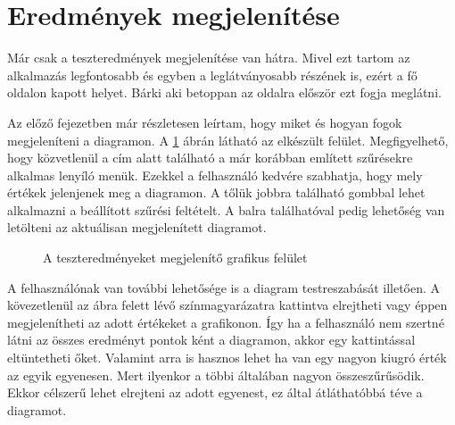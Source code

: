 \documentclass[12pt]{report} %
\begin{document}
\section{Eredmények megjelenítése} %

Már csak a teszteredmények megjelenítése van hátra. Mivel ezt tartom az alkalmazás legfontosabb és egyben a leglátványosabb részének is, ezért a fő oldalon kapott helyet. Bárki aki betoppan az oldalra először ezt fogja meglátni.

Az előző fejezetben már részletesen leírtam, hogy miket és hogyan fogok megjeleníteni a diagramon. A \ref{fig:Implementation9} ábrán látható az elkészült felület. Megfigyelhető, hogy közvetlenül a cím alatt található a már korábban említett szűrésekre alkalmas lenyíló menük. Ezekkel a felhasználó kedvére szabhatja, hogy mely értékek jelenjenek meg a diagramon. A tőlük jobbra található gombbal lehet alkalmazni a beállított szűrési feltételt. A balra találhatóval pedig lehetőség van letölteni az aktuálisan megjelenített diagramot.

\begin{figure}[H]
    \centering %
    \caption{A teszteredményeket megjelenítő grafikus felület} %
    \label{fig:Implementation9} %
\end{figure}

A felhasználónak van további lehetősége is a diagram testreszabását illetően. A kövezetlenül az ábra felett lévő színmagyarázatra kattintva elrejtheti vagy éppen megjelenítheti az adott értékeket a grafikonon. Így ha a felhasználó nem szertné látni az összes eredményt pontok ként a diagramon, akkor egy kattintással eltüntetheti őket. Valamint arra is hasznos lehet ha van egy nagyon kiugró érték az egyik egyenesen. Mert ilyenkor a többi általában nagyon összeszűrűsödik. Ekkor célszerű lehet elrejteni az adott egyenest, ez által átláthatóbbá téve a diagramot.
\end{document}
